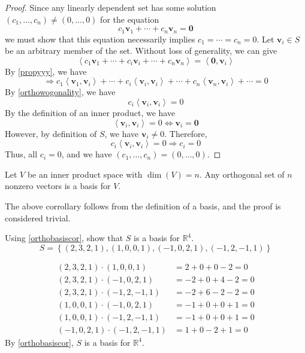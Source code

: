 \begin{proof}
    Since any linearly dependent set has some solution \(\left( c_1,\ldots,c_n \right)\neq (0,\ldots,0) \) for the equation 
    \[
        c_1 \mathbf{v}_1 +\cdots+c_n \mathbf{v}_n =\mathbf{0}
    \]
    we must show that this equation necessarily implies \(c_1 =\cdots=c_n=0\). Let \(\mathbf{v}_i\in S\) be an arbitrary member of the set. Without loss of generality, we can give
    \[
        \left\langle c_1 \mathbf{v}_1 +\cdots+c_i \mathbf{v}_i +\cdots+c_n \mathbf{v}_n \right\rangle = \left\langle \mathbf{0},\mathbf{v}_i \right\rangle
        \]
        By \ref{propyyy}, we have
        \[
        \Longrightarrow c_1 \left\langle \mathbf{v}_1,\mathbf{v}_i \right\rangle +\cdots+c_i \left\langle \mathbf{v}_i,\mathbf{v}_i \right\rangle +\cdots+c_n \left\langle \mathbf{v}_n,\mathbf{v}_i \right\rangle +\cdots=0
        \]
        By \ref{orthowogonality}, we have
        \[
            c_i \left\langle \mathbf{v}_i,\mathbf{v}_i \right\rangle =0
        \]
        By the definition of an inner product, we have 
        \[
            \left\langle \mathbf{v}_i,\mathbf{v}_i \right\rangle =0 \iff \mathbf{v}_i=\mathbf{0}
        \]
        However, by definition of \(S\), we have \(\mathbf{v}_i\neq 0\). Therefore,
        \[
            c_i \left\langle \mathbf{v}_i,\mathbf{v}_i \right\rangle =0 \Longrightarrow c_i=0
        \]
        Thus, all \(c_i=0\), and we have \(\left( c_1,\ldots,c_n \right)= (0,\ldots,0)\).
\end{proof}
\begin{corollary}\label{orthobasiscor}
    Let \(V\) be an inner product space with \(\dim (V)=n\). Any orthogonal set of \(n\) nonzero vectors is a basis for \(V\).
\end{corollary}
The above corrollary follows from the definition of a basis, and the proof is considered trivial. 
\begin{exercise}
    Using \ref{orthobasiscor}, show that \(S\) is a basis for \(\mathbb{R}^4\). 
    \[
        S=\left\{ (2,3,2,1),(1,0,0,1),(-1,0,2,1),(-1,2,-1,1) \right\} 
    \]
\end{exercise}
\begin{solution}
    \begin{align*}
        (2,3,2,1)\cdot(1,0,0,1)&=2+0+0-2=0\\
        (2,3,2,1)\cdot (-1,0,2,1)&=-2+0+4-2=0\\
        (2,3,2,1)\cdot(-1,2,-1,1)&=-2+6-2-2=0\\
        (1,0,0,1)\cdot(-1,0,2,1)&=-1+0+0+1=0\\
        (1,0,0,1)\cdot(-1,2,-1,1)&=-1+0+0+1=0\\
        (-1,0,2,1)\cdot(-1,2,-1,1)&=1+0-2+1=0
    \end{align*}
    By \ref{orthobasiscor}, \(S\) is a basis for \(\mathbb{R}^4\).
\end{solution}
